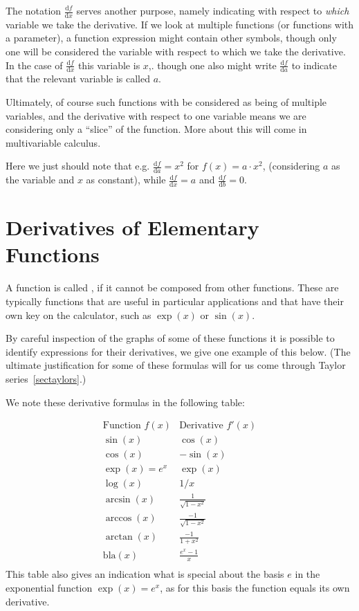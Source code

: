\begin{note}
The notation $\displaystyle\frac{\mbox{d}f}{\mbox{d}x}$ serves another
purpose, namely indicating with respect to {\em which} variable we take the
derivative. If we look at multiple functions (or functions with a
parameter), a function expression might contain other symbols, though only
one will be considered the variable with respect to which we take the
derivative. In the case of $\displaystyle\frac{\mbox{d}f}{\mbox{d}x}$ this
variable is $x$,. though one also might write
$\displaystyle\frac{\mbox{d}f}{\mbox{d}a}$ to indicate that the relevant
variable is called $a$.

Ultimately, of course such functions with be considered as being of multiple
variables, and the derivative with respect to one variable means we are
considering only a ``slice'' of the function. More about this will come in
multivariable calculus.

Here we just should note that e.g.
$\displaystyle\frac{\mbox{d}f}{\mbox{d}a}=x^2$ for $f(x)=a\cdot x^2$,
(considering $a$ as the variable and $x$ as constant), while
$\displaystyle\frac{\mbox{d}f}{\mbox{d}x}=a$ and
$\displaystyle\frac{\mbox{d}f}{\mbox{d}b}=0$.
\end{note}

\section{Derivatives of Elementary Functions}
\label{derelem}

A function is called , if it
cannot be composed from other functions. These are typically functions
that are useful in particular applications and that have their own key on the calculator, such as $\exp(x)$ or $\sin(x)$.

By careful inspection of the graphs of some of these functions it is possible
to identify expressions for their derivatives, we give one example of this
below. (The ultimate justification
for some of these formulas will for us come through Taylor
series~\ref{sectaylors}.)

We note these derivative formulas in the following table:

\[
\begin{array}{c|c}
\mbox{Function $f(x)$}&\mbox{Derivative $f'(x)$}\\
\hline
\sin(x)&\cos(x)\\
\cos(x)&-\sin(x)\\
\exp(x)=e^x&\exp(x)\\
\log(x)&1/x\\
\arcsin(x)&\frac{1}{\sqrt{1-x^2}}\\
\arccos(x)&\frac{-1}{\sqrt{1-x^2}}\\
\arctan(x)&\frac{-1}{1+x^2}\\
\mbox{bla}(x)&\frac{e^x-1}{x}\\
\end{array}
\]
This table also gives an indication what is special about the basis $e$ in
the exponential function $\exp(x)=e^x$, as for this basis the function equals
its own derivative.


